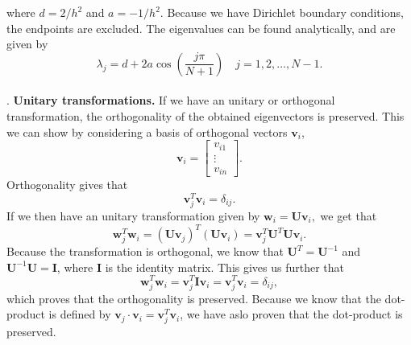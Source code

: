 \documentclass[a4paper,10pt]{article}
\begin{document}
where $d = 2/h^2$ and $a = -1/h^2$. Because we have Dirichlet boundary conditions, the endpoints are excluded. The eigenvalues can be found analytically, and are given by 
$$\lambda_j = d + 2a \cos\left(\frac{j\pi}{N+1}\right) \quad j = 1,2, \dots, N-1. $$ \\



. \textbf{Unitary transformations.} 
If we have an unitary or orthogonal transformation, the orthogonality of the obtained eigenvectors is preserved. This we can show by considering a basis of orthogonal vectors $\mathbf{v}_i$, 
$$
\mathbf{v}_i = 
 \begin{bmatrix}
  v_{i1} \\
  \vdots \\
  v_{in}
 \end{bmatrix}. 
$$
Orthogonality gives that 
$$ \mathbf{v}_j^T \mathbf{v}_i = \delta_{ij}.$$ 
If we then have an unitary transformation given by $\mathbf{w}_i = \mathbf{U} \mathbf{v}_i, $
we get that 
$$\mathbf{w}_j^T \mathbf{w}_i = (\mathbf{U} \mathbf{v}_j)^T (\mathbf{U} \mathbf{v}_i) =  \mathbf{v}_j^T \mathbf{U}^T \mathbf{U} \mathbf{v}_i.  $$
Because the transformation is orthogonal, we know that $\mathbf{U}^T = \mathbf{U}^{-1} $ and $\mathbf{U}^{-1}\mathbf{U} = \mathbf{I}$, where $\mathbf{I}$ is the identity matrix. This gives us further that 
$$\mathbf{w}_j^T \mathbf{w}_i = \mathbf{v}_j^T \mathbf{I} \mathbf{v}_i = \mathbf{v}_j^T \mathbf{v}_i = \delta_{ij},  $$
which proves that the orthogonality is preserved. Because we know that the dot-product is defined by $\mathbf{v}_j \cdot \mathbf{v}_i =  \mathbf{v}_j^T \mathbf{v}_i$, we have aslo proven that the dot-product is preserved. 
\end{document}
